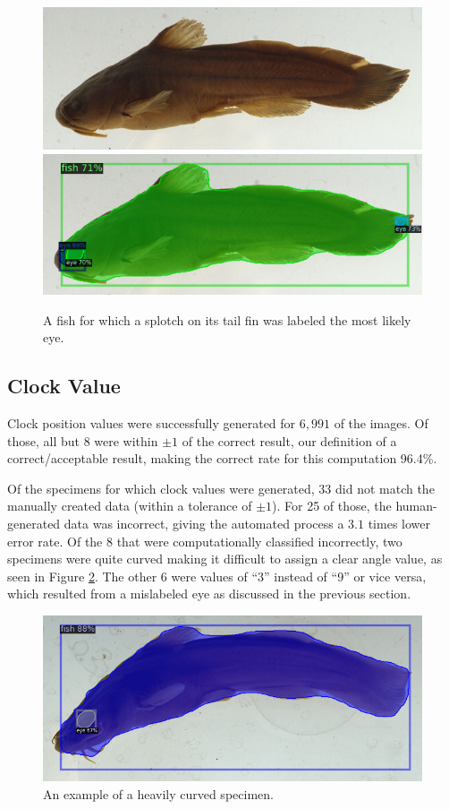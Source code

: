 \documentclass[conference]{IEEEtran}
\begin{document}
\begin{figure}[h]
  \centering
  \includegraphics[width=0.49\linewidth]{images/wrong_side_orig}
  \includegraphics[width=0.49\linewidth]{images/wrong_side1}
  \caption{A fish for which a splotch on its tail fin was labeled the most likely eye.}
  \label{fig:wrong_eye}
\end{figure}

\subsection{Clock Value}
Clock position values were successfully generated for \(6,991\) of the images. Of those, all but 8 were within \(\pm{}1\) of the correct result,
our definition of a correct/acceptable result, making the correct rate for
this computation 96.4\%.

Of the specimens for which clock values were generated, 33 did not match the manually created data (within a tolerance of \(\pm{}1\)).
For 25 of those, the human-generated data was incorrect, giving the automated process a \(3.1\) times lower error rate. Of the 8 that were
computationally classified incorrectly,
two specimens were quite curved making it difficult to assign a clear angle value, as
seen in Figure \ref{fig:curvedFish}.
The other 6 were values of ``3'' instead of ``9'' or vice versa, which resulted from
a mislabeled eye as discussed in the previous section.

\begin{figure}[h]
  \centering
  \includegraphics[width=0.7\linewidth]{images/curved1}
  \caption{An example of a heavily curved specimen.}
  \label{fig:curvedFish}
\end{figure}
\end{document}
